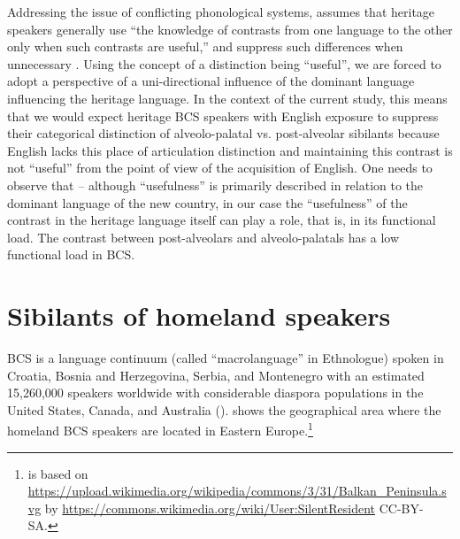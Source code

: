 \documentclass[output=paper,modfonts,newtxmath,hidelinks,]{langscibook}
\begin{document}
Addressing the issue of conflicting phonological systems, \citet{Polinsky2018} assumes that heritage speakers generally use “the knowledge of contrasts from one language to the other only when such contrasts are useful,” and suppress such differences when unnecessary \citep[115]{Polinsky2018}. Using the concept of a distinction being “useful”, we are forced to adopt a perspective of a uni-directional influence of the dominant language influencing the heritage language. In the context of the current study, this means that we would expect heritage BCS speakers with English exposure to suppress their categorical distinction of alveolo-palatal vs. post-alveolar sibilants because English lacks this place of articulation distinction and maintaining this contrast is not “useful” from the point of view of the acquisition of English. One needs to observe that – although “usefulness” is primarily described in relation to the dominant language of the new country, in our case the “usefulness” of the contrast in the heritage language itself can play a role, that is, in its functional load. The contrast between post-alveolars and alveolo-palatals has a low functional load in BCS.


\section{Sibilants of homeland speakers}\label{sec:mihajlovic:3}

BCS is a language continuum (called “macrolanguage” in Ethnologue) spoken in Croatia, Bosnia and Herzegovina, Serbia, and Montenegro with an estimated 15,260,000 speakers worldwide with considerable diaspora populations in the United States, Canada, and Australia (\citealt{Simons-Fennig2017}).  shows the geographical area where the homeland BCS speakers are located in Eastern Europe.\footnote{ is based on \url{https://upload.wikimedia.org/wikipedia/commons/3/31/Balkan_Peninsula.svg} by \url{https://commons.wikimedia.org/wiki/User:SilentResident} CC-BY-SA.}
\end{document}
